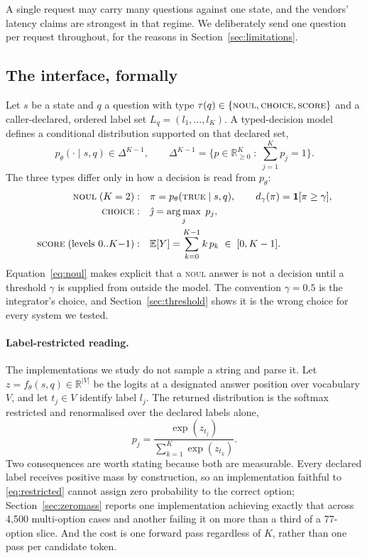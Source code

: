A single request may carry many questions against one state, and the vendors'
latency claims are strongest in that regime. We deliberately send one question per
request throughout, for the reasons in Section~\ref{sec:limitations}.

\subsection{The interface, formally}

Let $s$ be a state and $q$ a question with type
$\tau(q) \in \{\textsc{noul}, \textsc{choice}, \textsc{score}\}$ and a
caller-declared, ordered label set $L_q = (l_1, \dots, l_K)$. A typed-decision
model defines a conditional distribution supported on that declared set,
\begin{equation}
  p_\theta(\cdot \mid s, q) \in \Delta^{K-1},
  \qquad
  \Delta^{K-1} = \Big\{ p \in \mathbb{R}^{K}_{\ge 0} \;:\; \textstyle\sum_{j=1}^{K} p_j = 1 \Big\}.
  \label{eq:simplex}
\end{equation}
The three types differ only in how a decision is read from $p_\theta$:
\begin{align}
  \textsc{noul} \; (K=2):&\quad \pi = p_\theta(\textsc{true} \mid s,q), \qquad d_\gamma(\pi) = \mathbf{1}[\pi \ge \gamma], \label{eq:noul}\\
  \textsc{choice}:&\quad \hat\jmath = \operatorname*{arg\,max}_{j} \; p_j, \label{eq:choice}\\
  \textsc{score} \; (\text{levels } 0..K{-}1):&\quad \mathbb{E}[Y] = \sum_{k=0}^{K-1} k \, p_k \;\in\; [0, K-1]. \label{eq:score}
\end{align}
Equation~\eqref{eq:noul} makes explicit that a \textsc{noul} answer is not a
decision until a threshold $\gamma$ is supplied from outside the model. The
convention $\gamma = 0.5$ is the integrator's choice, and
Section~\ref{sec:threshold} shows it is the wrong choice for every system we
tested.

\paragraph{Label-restricted reading.} The implementations we study do not sample a
string and parse it. Let $z = f_\theta(s,q) \in \mathbb{R}^{|V|}$ be the logits at
a designated answer position over vocabulary $V$, and let $t_j \in V$ identify
label $l_j$. The returned distribution is the softmax restricted and renormalised
over the declared labels alone,
\begin{equation}
  p_j = \frac{\exp(z_{t_j})}{\sum_{k=1}^{K} \exp(z_{t_k})}.
  \label{eq:restricted}
\end{equation}
Two consequences are worth stating because both are measurable. Every declared
label receives positive mass by construction, so an implementation faithful to
\eqref{eq:restricted} cannot assign zero probability to the correct option;
Section~\ref{sec:zeromass} reports one implementation achieving exactly that
across 4{,}500 multi-option cases and another failing it on more than a third of a
77-option slice. And the cost is one forward pass regardless of $K$, rather than
one pass per candidate token.


